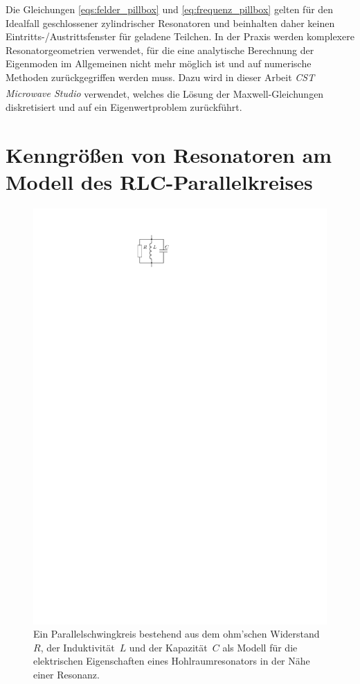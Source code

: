 Die Gleichungen \eqref{eqs:felder_pillbox} und \eqref{eq:frequenz_pillbox} gelten für den Idealfall geschlossener zylindrischer Resonatoren und beinhalten daher keinen Eintritts-/Austrittsfenster für geladene Teilchen.
In der Praxis werden komplexere Resonatorgeometrien verwendet, für die eine analytische Berechnung der Eigenmoden im Allgemeinen nicht mehr möglich ist und auf numerische Methoden zurückgegriffen werden muss.
Dazu wird in dieser Arbeit \emph{CST Microwave Studio\textsuperscript{\textregistered}} verwendet, welches die Lösung der Maxwell-Gleichungen diskretisiert und auf ein Eigenwertproblem zurückführt.


\section{Kenngrößen von Resonatoren am Modell des RLC-Parallelkreises}
\begin{figure}[htb]
  \centering
  \includegraphics[scale=1.4]{./figs/RLC_circuit.pdf}
  \caption{Ein Parallelschwingkreis bestehend aus dem ohm'schen Widerstand~$R$, der Induktivität~$L$ und der Kapazität~$C$ als Modell für die elektrischen Eigenschaften eines Hohlraumresonators in der Nähe einer Resonanz.}
  \label{fig:rlc_circuit}
\end{figure}
